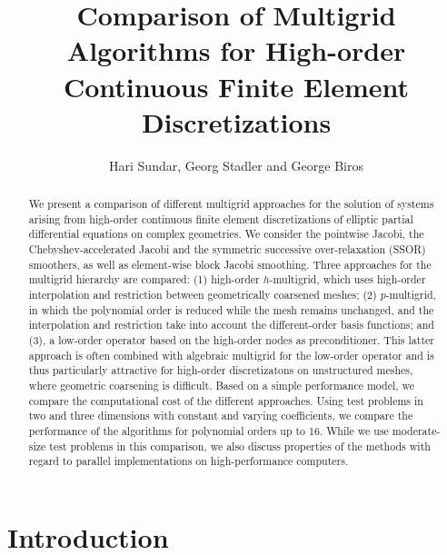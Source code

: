 \documentclass[smallcondensed,final]{svjour3}     %
\begin{document}

\title{Comparison of Multigrid Algorithms for High-order
  Continuous Finite Element Discretizations}
\author{Hari Sundar, Georg Stadler and George Biros}


\maketitle

\begin{abstract}
We present a comparison of different multigrid
approaches for the solution of systems arising from high-order
continuous finite element discretizations of elliptic partial
differential equations on complex geometries.  We consider the
pointwise Jacobi, the Chebyshev-accelerated Jacobi and the symmetric
successive over-relaxation (SSOR) smoothers, as well as
element-wise block Jacobi smoothing. Three approaches for the
multigrid hierarchy are compared: (1) high-order $h$-multigrid, which
uses high-order interpolation and restriction between geometrically
coarsened meshes; (2) $p$-multigrid, in which the polynomial order is
reduced while the mesh remains unchanged, and the interpolation and
restriction take into account the different-order basis functions; and
(3), a low-order operator based on the high-order nodes as
preconditioner. This latter approach is often combined with algebraic multigrid for
the low-order operator and is thus particularly attractive
for high-order discretizatons on unstructured meshes, where geometric
coarsening is difficult.  Based on a simple performance model, we
compare the computational cost of the different approaches.  Using
test problems in two and three dimensions with constant and varying
coefficients, we compare the performance of the algorithms for
polynomial orders up to 16.  While we use moderate-size test problems
in this comparison, we also discuss properties of the methods with
regard to parallel implementations on high-performance computers.
\end{abstract}


\section{Introduction}
\end{document}
